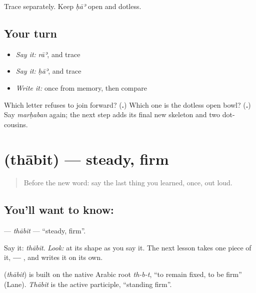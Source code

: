 Trace \textbf{ } separately. Keep \emph{ḥāʾ} open and dotless.

\subsection*{Your turn}
\begin{itemize}
\raggedright
  \item \emph{Say it:} \emph{rāʾ}, and trace \textbf{}
  \item \emph{Say it:} \emph{ḥāʾ}, and trace \textbf{}
  \item \emph{Write it:} \textbf{ } once from memory, then compare
\end{itemize}

\begin{tcolorbox}[breakable,colback=teal!4,colframe=teal!35!black,title={Before you move on}]
Which letter refuses to join forward? (\textbf{.}) Which one is the dotless open bowl? (\textbf{.}) Say \emph{marḥaban} again; the next step adds its final new skeleton and two dot-cousins.
\end{tcolorbox}
\section[\texorpdfstring{\ar{ثابت} (thābit)}{ثابت (thābit)}]{ (thābit) — steady, firm}

\label{lesson:AR-C01-thabit}



\begin{quote}
Before the new word: say the last thing you learned, once, out loud.
\end{quote}

\subsection*{You'll want to know: }
\textbf{} — \emph{thābit} — \textquotedblleft{}steady, firm\textquotedblright{}.

Say it: \emph{thābit}. \emph{Look:} at its shape as you say it. The next lesson takes one piece of it, \textbf{   — }, and writes it on its own.

\begin{cousinweb}
\textbf{} (\emph{thābit}) is built on the native Arabic root \emph{th-b-t}, \textquotedblleft{}to remain fixed, to be firm\textquotedblright{} (Lane). \emph{Thābit} is the active participle, \textquotedblleft{}standing firm\textquotedblright{}.
\end{cousinweb}

